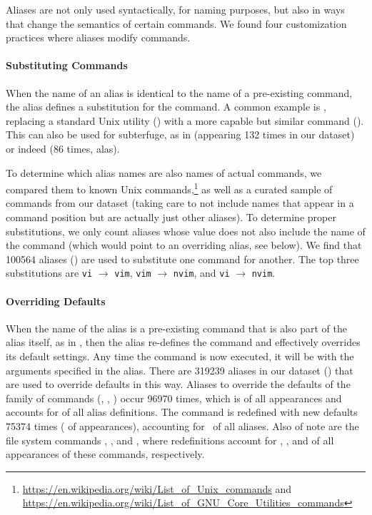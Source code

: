 Aliases are not only used syntactically, for naming purposes, but also in ways that change the semantics of certain commands.
We found four customization practices where aliases modify commands.

\paragraph{\bf Substituting Commands}

When the name of an alias is identical to the name of a pre-existing command, the alias defines a substitution for the command.
A common example is , replacing a standard Unix utility () with a more capable but similar command ().
This can also be used for subterfuge, as in  (appearing 132 times in our dataset) or indeed  (86 times, alas).

To determine which alias names are also names of actual commands, we compared them to known Unix commands,\footnote{\url{https://en.wikipedia.org/wiki/List_of_Unix_commands} and \url{https://en.wikipedia.org/wiki/List_of_GNU_Core_Utilities_commands}} as well as a curated sample of commands from our dataset (taking care to not include names that appear in a command position but are actually just other aliases).
To determine proper substitutions, we only count aliases whose value does not also include the name of the command (which would point to an overriding alias, see below).
We find that \num{100564} aliases () are used to substitute one command for another.
The top three substitutions are \verb|vi| $\rightarrow$ \verb|vim|, \verb|vim| $\rightarrow$ \verb|nvim|, and \verb|vi| $\rightarrow$ \verb|nvim|.

\paragraph{\bf Overriding Defaults}

When the name of the alias is a pre-existing command that is also part of the alias itself, as in , then the alias re-defines the command and effectively overrides its default settings.
Any time the command is now executed, it will be with the arguments specified in the alias.
There are \num{319239} aliases in our dataset () that are used to override defaults in this way.
Aliases to override the defaults of the  family of commands (, , ) occur \num{96970} times, which is  of all  appearances and accounts for  of all alias definitions.
The  command is redefined with new defaults \num{75374} times ( of  appearances), accounting for  of all aliases.
Also of note are the file system commands , , and , where redefinitions account for , , and  of all appearances of these commands, respectively.

